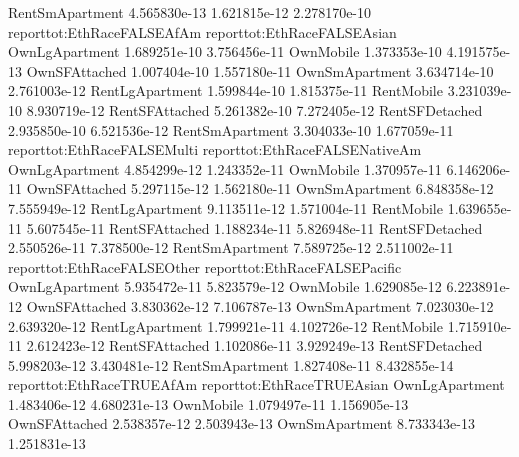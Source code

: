 \documentclass{article}
\begin{document}
\begin{Schunk}
\begin{Soutput}
RentSmApartment  4.565830e-13 1.621815e-12 2.278170e-10
                reporttot:EthRaceFALSEAfAm reporttot:EthRaceFALSEAsian
OwnLgApartment                1.689251e-10                3.756456e-11
OwnMobile                     1.373353e-10                4.191575e-13
OwnSFAttached                 1.007404e-10                1.557180e-11
OwnSmApartment                3.634714e-10                2.761003e-12
RentLgApartment               1.599844e-10                1.815375e-11
RentMobile                    3.231039e-10                8.930719e-12
RentSFAttached                5.261382e-10                7.272405e-12
RentSFDetached                2.935850e-10                6.521536e-12
RentSmApartment               3.304033e-10                1.677059e-11
                reporttot:EthRaceFALSEMulti reporttot:EthRaceFALSENativeAm
OwnLgApartment                 4.854299e-12                   1.243352e-11
OwnMobile                      1.370957e-11                   6.146206e-11
OwnSFAttached                  5.297115e-12                   1.562180e-11
OwnSmApartment                 6.848358e-12                   7.555949e-12
RentLgApartment                9.113511e-12                   1.571004e-11
RentMobile                     1.639655e-11                   5.607545e-11
RentSFAttached                 1.188234e-11                   5.826948e-11
RentSFDetached                 2.550526e-11                   7.378500e-12
RentSmApartment                7.589725e-12                   2.511002e-11
                reporttot:EthRaceFALSEOther reporttot:EthRaceFALSEPacific
OwnLgApartment                 5.935472e-11                  5.823579e-12
OwnMobile                      1.629085e-12                  6.223891e-12
OwnSFAttached                  3.830362e-12                  7.106787e-13
OwnSmApartment                 7.023030e-12                  2.639320e-12
RentLgApartment                1.799921e-11                  4.102726e-12
RentMobile                     1.715910e-11                  2.612423e-12
RentSFAttached                 1.102086e-11                  3.929249e-13
RentSFDetached                 5.998203e-12                  3.430481e-12
RentSmApartment                1.827408e-11                  8.432855e-14
                reporttot:EthRaceTRUEAfAm reporttot:EthRaceTRUEAsian
OwnLgApartment               1.483406e-12               4.680231e-13
OwnMobile                    1.079497e-11               1.156905e-13
OwnSFAttached                2.538357e-12               2.503943e-13
OwnSmApartment               8.733343e-13               1.251831e-13

\end{Soutput}
\end{Schunk}
\end{document}

